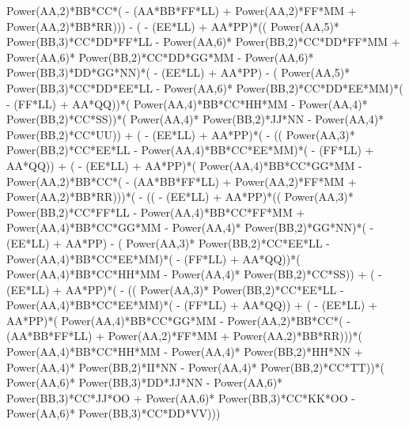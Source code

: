 \documentclass[10pt]{article} %
\begin{document}
Power(AA,2)*BB*CC*( - (AA*BB*FF*LL) +  Power(AA,2)*FF*MM +  Power(AA,2)*BB*RR))) - ( - (EE*LL) + AA*PP)*(( Power(AA,5)* Power(BB,3)*CC*DD*FF*LL -  Power(AA,6)* Power(BB,2)*CC*DD*FF*MM +  Power(AA,6)* Power(BB,2)*CC*DD*GG*MM -  Power(AA,6)* Power(BB,3)*DD*GG*NN)*( - (EE*LL) + AA*PP) - ( Power(AA,5)* Power(BB,3)*CC*DD*EE*LL -  Power(AA,6)* Power(BB,2)*CC*DD*EE*MM)*( - (FF*LL) + AA*QQ))*( Power(AA,4)*BB*CC*HH*MM -  Power(AA,4)* Power(BB,2)*CC*SS))*( Power(AA,4)* Power(BB,2)*JJ*NN -  Power(AA,4)* Power(BB,2)*CC*UU)) + ( - (EE*LL) + AA*PP)*( - (( Power(AA,3)* Power(BB,2)*CC*EE*LL -  Power(AA,4)*BB*CC*EE*MM)*( - (FF*LL) + AA*QQ)) + ( - (EE*LL) + AA*PP)*( Power(AA,4)*BB*CC*GG*MM -  Power(AA,2)*BB*CC*( - (AA*BB*FF*LL) +  Power(AA,2)*FF*MM +  Power(AA,2)*BB*RR)))*( - (( - (EE*LL) + AA*PP)*(( Power(AA,3)* Power(BB,2)*CC*FF*LL -  Power(AA,4)*BB*CC*FF*MM +  Power(AA,4)*BB*CC*GG*MM -  Power(AA,4)* Power(BB,2)*GG*NN)*( - (EE*LL) + AA*PP) - ( Power(AA,3)* Power(BB,2)*CC*EE*LL -  Power(AA,4)*BB*CC*EE*MM)*( - (FF*LL) + AA*QQ))*( Power(AA,4)*BB*CC*HH*MM -  Power(AA,4)* Power(BB,2)*CC*SS)) + ( - (EE*LL) + AA*PP)*( - (( Power(AA,3)* Power(BB,2)*CC*EE*LL -  Power(AA,4)*BB*CC*EE*MM)*( - (FF*LL) + AA*QQ)) + ( - (EE*LL) + AA*PP)*( Power(AA,4)*BB*CC*GG*MM -  Power(AA,2)*BB*CC*( - (AA*BB*FF*LL) +  Power(AA,2)*FF*MM +  Power(AA,2)*BB*RR)))*( Power(AA,4)*BB*CC*HH*MM -  Power(AA,4)* Power(BB,2)*HH*NN +  Power(AA,4)* Power(BB,2)*II*NN -  Power(AA,4)* Power(BB,2)*CC*TT))*( Power(AA,6)* Power(BB,3)*DD*JJ*NN -  Power(AA,6)* Power(BB,3)*CC*JJ*OO +  Power(AA,6)* Power(BB,3)*CC*KK*OO -  Power(AA,6)* Power(BB,3)*CC*DD*VV)))
\end{document}
